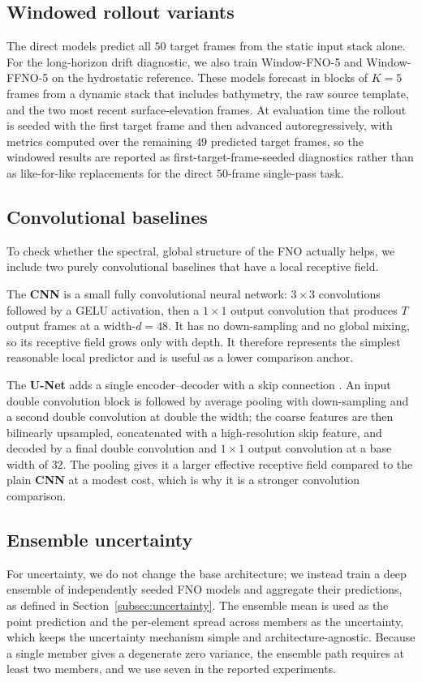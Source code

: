 \subsection{Windowed rollout variants}
\label{subsec:window-models}

The direct models predict all $50$ target frames from the static input stack alone. For the long-horizon drift diagnostic, we also train Window-FNO-5 and Window-FFNO-5 on the hydrostatic reference. These models forecast in blocks of $K=5$ frames from a dynamic stack that includes bathymetry, the raw source template, and the two most recent surface-elevation frames. At evaluation time the rollout is seeded with the first target frame and then advanced autoregressively, with metrics computed over the remaining $49$ predicted target frames, so the windowed results are reported as first-target-frame-seeded diagnostics rather than as like-for-like replacements for the direct $50$-frame single-pass task.

\subsection{Convolutional baselines}
\label{subsec:conv-baseline}

To check whether the spectral, global structure of the FNO actually helps, we include two purely convolutional baselines that have a local receptive field.

The \textbf{CNN} is a small fully convolutional neural network: $3 \times 3$ convolutions followed by a GELU activation, then a $1 \times 1$ output convolution that produces $T$ output frames at a width-$d = 48$. It has no down-sampling and no global mixing, so its receptive field grows only with depth. It therefore represents the simplest reasonable local predictor and is useful as a lower comparison anchor.

The \textbf{U-Net} adds a single encoder--decoder with a skip connection \citep{ronneberger2015unet}. An input double convolution block is followed by average pooling with down-sampling and a second double convolution at double the width; the coarse features are then bilinearly upsampled, concatenated with a high-resolution skip feature, and decoded by a final double convolution and $1 \times 1$ output convolution at a base width of $32$. The pooling gives it a larger effective receptive field compared to the plain \textbf{CNN} at a modest cost, which is why it is a stronger convolution comparison.

\subsection{Ensemble uncertainty}
\label{subsec:model-ensemble}
For uncertainty, we do not change the base architecture; we instead train a deep ensemble of independently seeded FNO models and aggregate their predictions, as defined in Section~\ref{subsec:uncertainty}. The ensemble mean is used as the point prediction and the per-element spread across members as the uncertainty, which keeps the uncertainty mechanism simple and architecture-agnostic. Because a single member gives a degenerate zero variance, the ensemble path requires at least two members, and we use seven in the reported experiments.
